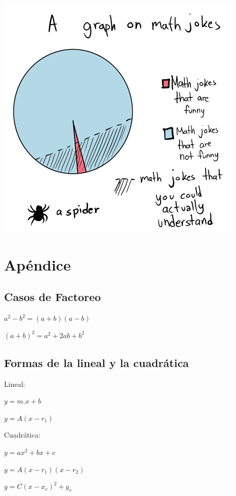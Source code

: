 \documentclass[a4paper,11pt,spanish,sans]{exam}
\begin{document}
\begin{itemize}
\begin{minipage}{0.5\textwidth}
\centering
\includegraphics[width= 0.7\linewidth]{mathjokegraph.png}
\label{fig:erise}

\end{minipage}

\end{itemize}

%
%



\section*{Apéndice}
\subsection*{Casos de Factoreo}

$a^2-b^2=(a+b)(a-b)$

$(a+b)^2=a^2+2ab+b^2$

\subsection*{Formas de la lineal y la cuadrática}

Lineal:

$y=m.x+b$

$y=A(x-r_1)$

Cuadrática:

$y=ax^2+bx+c$

$y=A(x-r_1)(x-r_2)$

$y=C(x-x_v)^2+y_v$
\end{document}
